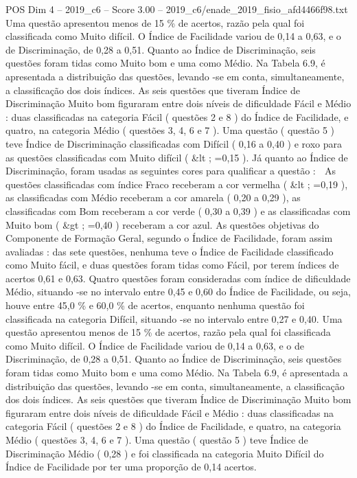 \begin{textsample}{POS Dim 4 – 2019\_c6 – Score 3.00 – 2019\_c6/enade\_2019\_fisio\_afd4466f98.txt}
Uma questão apresentou menos de 15 \% de acertos, razão pela qual foi classificada como Muito difícil.
O Índice de Facilidade variou de 0,14 a 0,63, e o de Discriminação, de 0,28 a 0,51.
Quanto ao Índice de Discriminação, seis questões foram tidas como Muito bom e uma como Médio.
Na Tabela 6.9, é apresentada a distribuição das questões, levando -se em conta, simultaneamente, a classificação dos dois índices.
As seis questões que tiveram Índice de Discriminação Muito bom figuraram entre dois níveis de dificuldade Fácil e Médio : duas classificadas na categoria Fácil ( questões 2 e 8 ) do Índice de Facilidade, e quatro, na categoria Médio ( questões 3, 4, 6 e 7 ).
Uma questão ( questão 5 ) teve Índice de Discriminação classificadas com Difícil ( 0,16 a 0,40 ) e roxo para as questões classificadas com Muito difícil ( \&lt ; =0,15 ).
Já quanto ao Índice de Discriminação, foram usadas as seguintes cores para qualificar a questão :  As questões classificadas com índice Fraco receberam a cor vermelha ( \&lt ; =0,19 ), as classificadas com Médio receberam a cor amarela ( 0,20 a 0,29 ), as classificadas com Bom receberam a cor verde ( 0,30 a 0,39 ) e as classificadas com Muito bom ( \&gt ; =0,40 ) receberam a cor azul.
As questões objetivas do Componente de Formação Geral, segundo o Índice de Facilidade, foram assim avaliadas : das sete questões, nenhuma teve o Índice de Facilidade classificado como Muito fácil, e duas questões foram tidas como Fácil, por terem índices de acertos 0,61 e 0,63.
Quatro questões foram consideradas com índice de dificuldade Médio, situando -se no intervalo entre 0,45 e 0,60 do Índice de Facilidade, ou seja, houve entre 45,0 \% e 60,0 \% de acertos, enquanto nenhuma questão foi classificada na categoria Difícil, situando -se no intervalo entre 0,27 e 0,40.
Uma questão apresentou menos de 15 \% de acertos, razão pela qual foi classificada como Muito difícil.
O Índice de Facilidade variou de 0,14 a 0,63, e o de Discriminação, de 0,28 a 0,51.
Quanto ao Índice de Discriminação, seis questões foram tidas como Muito bom e uma como Médio.
Na Tabela 6.9, é apresentada a distribuição das questões, levando -se em conta, simultaneamente, a classificação dos dois índices.
As seis questões que tiveram Índice de Discriminação Muito bom figuraram entre dois níveis de dificuldade Fácil e Médio : duas classificadas na categoria Fácil ( questões 2 e 8 ) do Índice de Facilidade, e quatro, na categoria Médio ( questões 3, 4, 6 e 7 ).
Uma questão ( questão 5 ) teve Índice de Discriminação Médio ( 0,28 ) e foi classificada na categoria Muito Difícil do Índice de Facilidade por ter uma proporção de 0,14 acertos.

\end{textsample}
